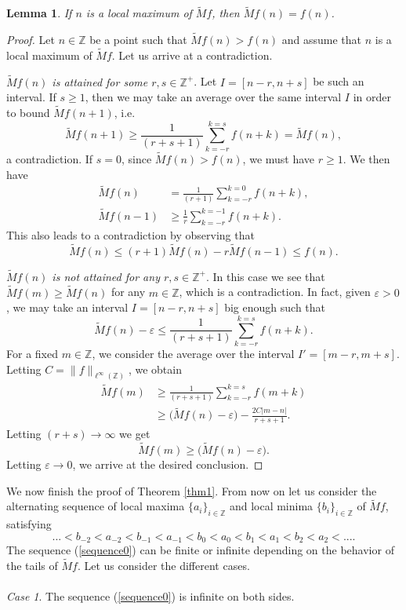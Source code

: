 \documentclass[reqno]{amsart}
\newtheorem{lemma}[theorem]{Lemma}
\theoremstyle{definition}
\theoremstyle{remark}
\numberwithin{equation}{section}
\newcommand{\Z}{\mathbb{Z}}
\newcommand{\wM}{\widetilde{M}}
\begin{document}
\begin{lemma}\label{lemma_extrema}
If $n$ is a local maximum of $\wM  f$, then $\wM  f(n) = f(n)$.
\end{lemma}
\begin{proof}
Let $n \in \Z$ be a point such that $\wM  f(n) > f(n)$ and assume that $n$ is a local maximum of $\wM  f$. Let us arrive at a contradiction.

\medskip

 {\it $\wM  f(n)$ is attained for some $r,s \in \Z^+$}. Let $I = [n-r,n+s]$ be such an interval. If $s\geq 1$, then we may take an average over the same interval $I$ in order to bound $\wM  f(n+1)$, i.e.
$$ \wM  f(n+1) \geq \frac{1}{(r +s+ 1)} \sum_{k=-r}^{k=s} f(n+k) = \wM  f(n),$$
a contradiction. If $s=0$, since $\wM  f(n) > f(n)$, we must have $r \geq 1$. We then have
\begin{align*}
\wM  f(n)  & = \frac{1}{(r + 1)} \sum_{k=-r}^{k=0} f(n+k),\\
\wM  f(n-1) & \geq \frac{1}{r} \sum_{k=-r}^{k=-1} f(n+k).
\end{align*}
This also leads to a contradiction by observing that 
$$\wM  f(n) \leq (r+1) \wM  f(n) - r \wM  f(n-1)  \leq f(n). $$

\medskip

 {\it $\wM  f(n)$ is not attained for any $r,s \in \Z^+$}. In this case we see that $\wM  f(m) \geq \wM  f(n)$ for any $m \in \Z$, which is a contradiction. In fact, given $\varepsilon >0$, we may take an interval $I = [n-r,n+s]$ big enough such that 
$$\wM  f(n) -\varepsilon \leq \frac{1}{(r +s+ 1)} \sum_{k=-r}^{k=s} f(n+k).$$
For a fixed $m \in \Z$, we consider the average over the interval $I' = [m-r,m+s]$. Letting $C = \|f\|_{\ell^{\infty}(\Z)}$, we obtain
\begin{align*}
\wM  f(m) & \geq \frac{1}{(r +s+ 1)} \sum_{k=-r}^{k=s} f(m+k)\\
& \geq \big(\wM  f(n) -\varepsilon\big) - \frac{2C |m-n|}{r + s +1}.
\end{align*}
Letting $(r + s) \to \infty$ we get
$$\wM  f(m) \geq (\wM  f(n) -\varepsilon\big).$$
Letting $\varepsilon \to 0$, we arrive at the desired conclusion.
\end{proof}

We now finish the proof of Theorem \ref{thm1}. From now on let  us consider the alternating sequence of local maxima $\{a_i\}_{i\in \Z}$ and local minima $\{b_i\}_{i\in \Z}$ of $\wM  f$, satisfying
\begin{equation}\label{sequence0}
...< b_{-2} < a_{-2} < b_{-1} < a_{-1} < b_0 < a_0 < b_1 < a_1 < b_2 < a_ 2 < ....
\end{equation}
The sequence (\ref{sequence0}) can be finite or infinite depending on the behavior of the tails of $\wM  f$. Let us consider the different cases.\\
\\
{\it Case 1}. The sequence (\ref{sequence0}) is infinite on both sides.\\
\end{document}

